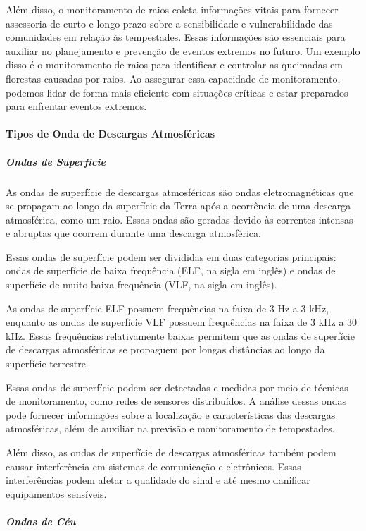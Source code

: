 \documentclass[a4paper, 12pt, onecolumn,singlespacing]{article}
\begin{document}
	Além disso, o monitoramento de raios coleta informações vitais para fornecer assessoria de curto e longo prazo sobre a sensibilidade e vulnerabilidade das comunidades em relação às tempestades. Essas informações são essenciais para auxiliar no planejamento e prevenção de eventos extremos no futuro. Um exemplo disso é o monitoramento de raios para identificar e controlar as queimadas em florestas causadas por raios. Ao assegurar essa capacidade de monitoramento, podemos lidar de forma mais eficiente com situações críticas e estar preparados para enfrentar eventos extremos.
	
	
	\paragraph{Tipos de Onda de Descargas Atmosféricas}
	
		\subparagraph{Ondas de Superfície}
		
		As ondas de superfície de descargas atmosféricas são ondas eletromagnéticas que se propagam ao longo da superfície da Terra após a ocorrência de uma descarga atmosférica, como um raio. Essas ondas são geradas devido às correntes intensas e abruptas que ocorrem durante uma descarga atmosférica.
		
		Essas ondas de superfície podem ser divididas em duas categorias principais: ondas de superfície de baixa frequência (ELF, na sigla em inglês) e ondas de superfície de muito baixa frequência (VLF, na sigla em inglês).
		
		As ondas de superfície ELF possuem frequências na faixa de 3 Hz a 3 kHz, enquanto as ondas de superfície VLF possuem frequências na faixa de 3 kHz a 30 kHz. Essas frequências relativamente baixas permitem que as ondas de superfície de descargas atmosféricas se propaguem por longas distâncias ao longo da superfície terrestre.
		
		Essas ondas de superfície podem ser detectadas e medidas por meio de técnicas de monitoramento, como redes de sensores distribuídos. A análise dessas ondas pode fornecer informações sobre a localização e características das descargas atmosféricas, além de auxiliar na previsão e monitoramento de tempestades.
		
		Além disso, as ondas de superfície de descargas atmosféricas também podem causar interferência em sistemas de comunicação e eletrônicos. Essas interferências podem afetar a qualidade do sinal e até mesmo danificar equipamentos sensíveis.
		
		\subparagraph{Ondas de Céu}
		
\end{document}
